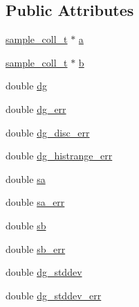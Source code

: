 \subsection*{\-Public \-Attributes}
\begin{DoxyCompactItemize}
\item 
\hyperlink{structsample__coll__t}{sample\-\_\-coll\-\_\-t} $\ast$ \hyperlink{structbarres__t_a3eee391c04ae6550b8ffb6db6b7d560e}{a}
\item 
\hyperlink{structsample__coll__t}{sample\-\_\-coll\-\_\-t} $\ast$ \hyperlink{structbarres__t_aadf370b83d7efc908b257971cefbfeec}{b}
\item 
double \hyperlink{structbarres__t_ad51313ffddd69578d5c682350d2923f8}{dg}
\item 
double \hyperlink{structbarres__t_a3253b9a6733ca4e28305d3e7db548355}{dg\-\_\-err}
\item 
double \hyperlink{structbarres__t_a26fd2829088aa3e1e3133f20caa64375}{dg\-\_\-disc\-\_\-err}
\item 
double \hyperlink{structbarres__t_a7eccdd91e164dc3a87569d3a55836832}{dg\-\_\-histrange\-\_\-err}
\item 
double \hyperlink{structbarres__t_a78719008769eeec026c8cadb4f4844a8}{sa}
\item 
double \hyperlink{structbarres__t_a0f7b27ae0eac41fba702156032d5f1da}{sa\-\_\-err}
\item 
double \hyperlink{structbarres__t_a016d7cb86e6adedd83d12063b1bc6e70}{sb}
\item 
double \hyperlink{structbarres__t_a0db5f10ddb3f16c1693156e9f2042b16}{sb\-\_\-err}
\item 
double \hyperlink{structbarres__t_af703394cd97b1f6d9d037d36cfbd9ce0}{dg\-\_\-stddev}
\item 
double \hyperlink{structbarres__t_a43dd4e3d2a137f5b739bc4442411ee29}{dg\-\_\-stddev\-\_\-err}
\end{DoxyCompactItemize}


